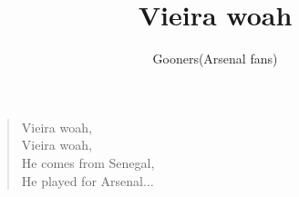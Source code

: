 \documentclass[a4paper,12pt]{article}
\title{Vieira woah}
\author{Gooners(Arsenal fans)}
\date{}
\begin{document}
	
	\maketitle
	
	\begin{verse}
		
		Vieira woah, \\
		Vieira woah, \\
		He comes from Senegal, \\
		He played for Arsenal$\ldots$
		
	\end{verse}
	
\end{document}
